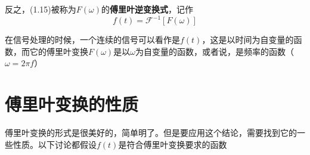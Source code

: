 \documentclass[UTF8]{ctexbook}
\begin{document}
			反之，(1.15)被称为$F(\omega)$的\textbf{傅里叶逆变换式}，记作
			\begin{equation}
				f(t)=\mathscr{F}^{-1}[F(\omega)]
			\end{equation}
			
			在信号处理的时候，一个连续的信号可以看作是$f(t)$，这是以时间为自变量的函数，而它的傅里叶变换$F(\omega)$是以$\omega$为自变量的函数，或者说，是频率的函数（$\omega=2\pi f$）

		\section{傅里叶变换的性质}

			傅里叶变换的形式是很美好的，简单明了。但是要应用这个结论，需要找到它的一些性质。以下讨论都假设$f(t)$是符合傅里叶变换要求的函数
\end{document}
